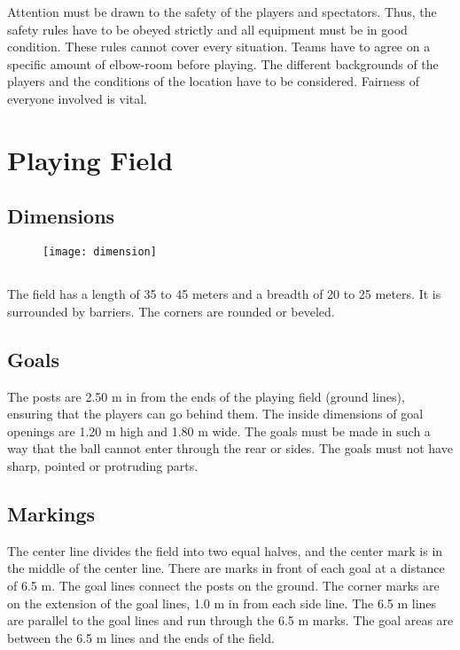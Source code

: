 Attention must be drawn to the safety of the players and spectators.
Thus, the safety rules have to be obeyed strictly and all equipment must be in good condition.
These rules cannot cover every situation.
Teams have to agree on a specific amount of elbow-room before playing.
The different backgrounds of the players and the conditions of the location have to be considered.
Fairness of everyone involved is vital.

\section{Playing Field}

\subsection{Dimensions}

\begin{figure}[h]
\begin{center}
\texttt{[image: dimension]}
\end{center}
\end{figure}

\subsection{}
The field has a length of 35 to 45 meters and a breadth of 20 to 25 meters.
It is surrounded by barriers.
The corners are rounded or beveled.

\subsection{Goals}
The posts are 2.50 m in from the ends of the playing field (ground lines), ensuring that the players can go behind them.
The inside dimensions of goal openings are 1.20 m high and 1.80 m wide.
The goals must be made in such a way that the ball cannot enter through the rear or sides. The goals must not have sharp, pointed or protruding parts.

\subsection{Markings}
The center line divides the field into two equal halves, and the center mark is in the middle of the center line.
There are marks in front of each goal at a distance of 6.5 m.
The goal lines connect the posts on the ground.
The corner marks are on the extension of the goal lines, 1.0 m in from each side line.
The 6.5 m lines are parallel to the goal lines and run through the 6.5 m marks.
The goal areas are between the 6.5 m lines and the ends of the field.

